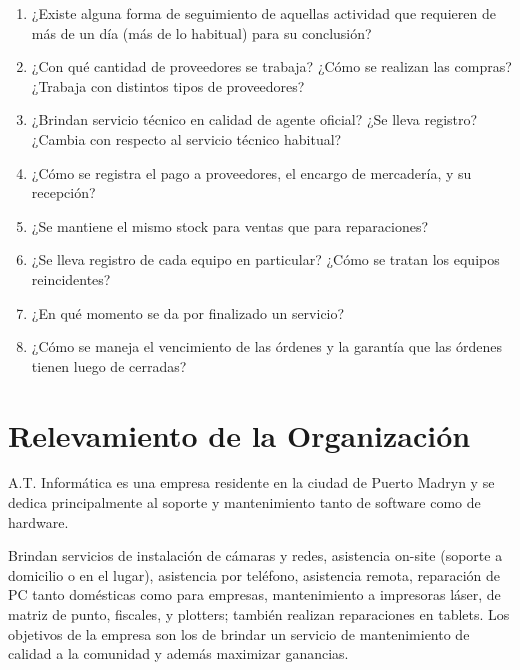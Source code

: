\documentclass[12pt]{extarticle}
\begin{document}
\begin{spacing}{1.2}
\begin{enumerate}
        \item ¿Existe alguna forma de seguimiento de aquellas actividad que requieren de más de un día (más de lo habitual) para su conclusión?
        \item ¿Con qué cantidad de proveedores se trabaja? ¿Cómo se realizan las compras? ¿Trabaja con distintos tipos de proveedores?
        \item ¿Brindan servicio técnico en calidad de agente oficial? ¿Se lleva registro? ¿Cambia con respecto al servicio técnico habitual?
        \item ¿Cómo se registra el pago a proveedores, el encargo de mercadería, y su recepción?
        \item ¿Se mantiene el mismo stock para ventas que para reparaciones?
        \item ¿Se lleva registro de cada equipo en particular? ¿Cómo se tratan los equipos reincidentes?
        \item ¿En qué momento se da por finalizado un servicio?
        \item ¿Cómo se maneja el vencimiento de las órdenes y la garantía que las órdenes tienen luego de cerradas?
    \end{enumerate}

    \pagebreak









    \section{Relevamiento de la Organización}
    A.T. Informática es una empresa residente en la ciudad de Puerto Madryn y se dedica principalmente al soporte y mantenimiento tanto de software como de hardware.

    Brindan servicios de instalación de cámaras y redes, asistencia on-site (soporte a domicilio o en el lugar), asistencia por teléfono, asistencia remota, reparación de PC tanto domésticas como para empresas, mantenimiento a impresoras láser, de matriz de punto, fiscales, y plotters; también realizan reparaciones en tablets.  Los objetivos de la empresa son los de brindar un servicio de mantenimiento de calidad a la comunidad y además maximizar ganancias.\\

    \pagebreak

\end{spacing}
\end{document}

